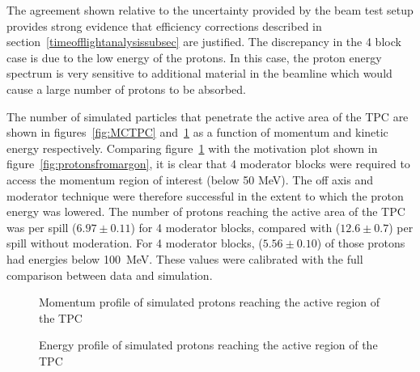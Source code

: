 The agreement shown relative to the uncertainty provided by the beam test setup provides strong evidence that efficiency corrections described in section~\ref{timeofflightanalysissubsec} are justified.
The discrepancy in the 4 block case is due to the low energy of the protons.
In this case, the proton energy spectrum is very sensitive to additional material in the beamline which would cause a large number of protons to be absorbed.

The number of simulated particles that penetrate the active area of the TPC are shown in figures~\ref{fig:MCTPC} and~\ref{fig:MCKE} as a function of momentum and kinetic energy respectively.
Comparing figure~\ref{fig:MCKE} with the motivation plot shown in figure~\ref{fig:protonsfromargon}, it is clear that 4 moderator blocks were required to access the momentum region of interest (below 50 MeV).
The off axis and moderator technique were therefore successful in the extent to which the proton energy was lowered.
The number of protons reaching the active area of the TPC was  per spill ($6.97 \pm  0.11$) for 4 moderator blocks, compared with ($12.6 \pm 0.7$) per spill without moderation. 
For 4 moderator blocks, ($5.56 \pm  0.10$) of those protons had energies below 100~MeV.
These values were calibrated with the full comparison between data and simulation.

\begin{figure}[!ht]
  \begin{minipage}[t]{0.48\textwidth}
    \begin{adjustbox}{max totalsize={\textwidth}{.35\textheight}, center}
      
    \end{adjustbox}
    \caption{Momentum profile of simulated protons reaching the active region of the TPC}
    \label{fig:MCTPC}
  \end{minipage}
  \hspace{0.3cm}
  \begin{minipage}[t]{0.48\textwidth}
    \begin{adjustbox}{max totalsize={\textwidth}{.35\textheight}, center}
      
    \end{adjustbox}
    \caption{Energy profile of simulated protons reaching the active region of the TPC}
    \label{fig:MCKE}
  \end{minipage}	
\end{figure}
    

